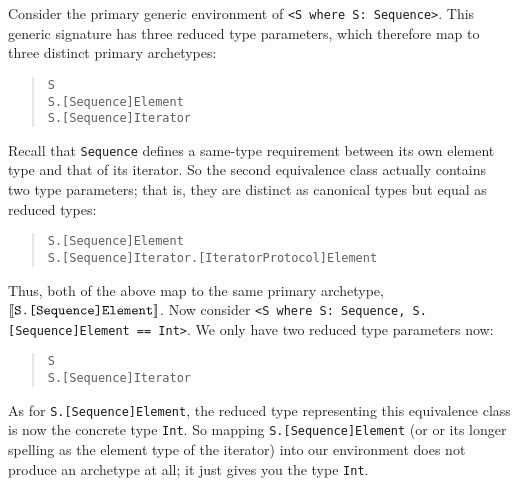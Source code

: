 \documentclass[../generics]{subfiles}
\begin{document}
\begin{example}
%
Consider the primary generic environment of \verb|<S where S: Sequence>|. This generic signature has three reduced type parameters, which therefore map to three distinct primary archetypes:
\begin{quote}
\begin{verbatim}
S
S.[Sequence]Element
S.[Sequence]Iterator
\end{verbatim}
\end{quote}
Recall that \texttt{Sequence} defines a same-type requirement between its own element type and that of its iterator. So the second equivalence class actually contains two type parameters; that is, they are distinct as canonical types but equal as reduced types:
\begin{quote}
\begin{verbatim}
S.[Sequence]Element
S.[Sequence]Iterator.[IteratorProtocol]Element
\end{verbatim}
\end{quote}
Thus, both of the above map to the same primary archetype, $[\![\texttt{S.[Sequence]Element}]\!]$.
Now consider \verb|<S where S: Sequence, S.[Sequence]Element == Int>|. We only have two reduced type parameters now:
\begin{quote}
\begin{verbatim}
S
S.[Sequence]Iterator
\end{verbatim}
\end{quote}
As for \texttt{S.[Sequence]Element}, the reduced type representing this equivalence class is now the concrete type \texttt{Int}. So mapping \texttt{S.[Sequence]Element} (or or its longer spelling as the element type of the iterator) into our environment does not produce an archetype at all;  it just gives you the type \texttt{Int}.
\end{example}
\end{document}
